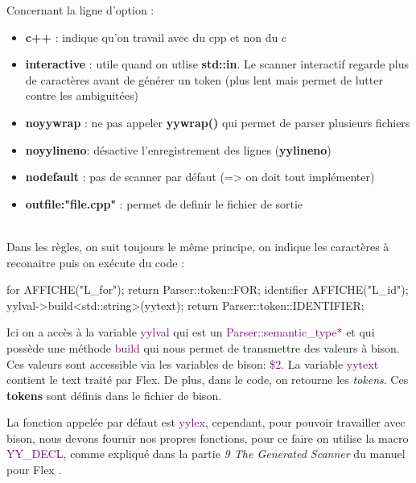 \documentclass[a4paper]{article}
\begin{document}
\noindent
Concernant la ligne d'option :
\begin{itemize}
\item \textbf{c++} : indique qu'on travail avec du cpp et non du c
\item \textbf{interactive} : utile quand on utlise \textbf{std::in}. Le scanner interactif regarde plus de caractères avant de générer un token (plus lent mais permet de lutter contre les ambiguitées)
\item \textbf{noyywrap} : ne pas appeler \textbf{yywrap()} qui permet de parser plusieurs fichiers
\item \textbf{noyylineno}: désactive l'enregistrement des lignes (\textbf{yylineno})
\item \textbf{nodefault} : pas de scanner par défaut (=> on doit tout implémenter)
\item \textbf{outfile:"file.cpp"} : permet de definir le fichier de sortie
\end{itemize}\leavevmode\\[3\baselineskip]


\noindent
Dans les règles, on suit toujours le même principe, on indique les caractères à reconaitre puis on exécute du code :\\

\begin{code}
for          { AFFICHE("L_for"); return Parser::token::FOR; }
{identifier} {
  AFFICHE("L_id");
  yylval->build<std::string>(yytext);
  return Parser::token::IDENTIFIER;
}
\end{code}\leavevmode\newline

\noindent
Ici on a accès à la variable \textcolor{purple}{yylval} qui est un \textcolor{purple}{Parser::semantic\_type*} et qui possède une méthode \textcolor{purple}{build} qui nous permet de transmettre des valeurs à bison.\\
Ces valeurs sont accessible via les variables de bison: \textcolor{purple}{\$2}. La variable
\textcolor{purple}{yytext} contient le text traité par Flex. De plus, dans le code, on retourne
les \textit{tokens}. Ces \textbf{tokens} sont définis dans le fichier de bison.
\newline

La fonction appelée par défaut est \textcolor{purple}{yylex}, cependant, pour pouvoir travailler avec bison, nous devons fournir nos propres fonctions, pour ce faire on utilise la macro \textcolor{purple}{YY\_DECL}, comme expliqué dans la partie \textit{9 The Generated Scanner} du manuel pour Flex \cite{flexmanual}.
\end{document}
